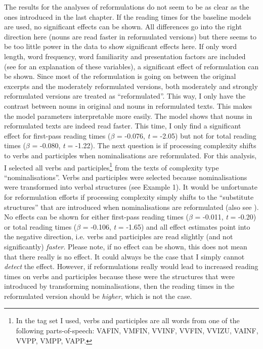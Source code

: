 \documentclass[output=paper]{langsci/langscibook}
\begin{document}
The results for the analyses of reformulations do not seem to be as clear as the ones introduced in the last chapter. If the reading times for the baseline models are used, no significant effects can be shown. All differences go into the right direction here (nouns are read faster in reformulated versions) but there seems to be too little power in the data to show significant effects here. If only word length, word frequency, word familiarity and presentation factors are included (see  for an explanation of these variables), a significant effect of reformulation can be shown. Since most of the reformulation is going on between the original excerpts and the moderately reformulated versions, both moderately and strongly reformulated versions are treated as ``reformulated''. This way, I only have the contrast between nouns in original and nouns in reformulated texts. This makes the model parameters interpretable more easily. The model shows that nouns in reformulated texts are indeed read faster. This time, I only find a significant effect for first-pass reading times (\textit{$\beta $} = -0.076, \textit{t} = -2.05) but not for total reading times (\textit{$\beta $} = -0.080, \textit{t} = -1.22).
The next question is if processing complexity shifts to verbs and participles when nominalisations are reformulated. For this analysis, I selected all verbs and participles\footnote{In the tag set I used, verbs and participles are all words from one of the following parts-of-speech: VAFIN, VMFIN, VVINF, VVFIN, VVIZU, VAINF, VVPP, VMPP, VAPP.}{ }from the texts of complexity type ``nominalisations''. Verbs and participles were selected because nominalisations were transformed into verbal structures (see Example 1). It would be unfortunate for reformulation efforts if processing complexity simply shifts to the ``substitute structures'' that are introduced when nominalisations are reformulated (also see ). No effects can be shown for either first-pass reading times (\textit{$\beta $} = -0.011, \textit{t} = -0.20) or total reading times (\textit{$\beta $} = -0.106, \textit{t} = -1.65) and all effect estimates point into the negative direction, i.e. verbs and participles are read slightly (and not significantly) \textit{faster}. Please note, if no effect can be shown, this does not mean that there really is no effect. It could always be the case that I simply cannot \textit{detect} the effect. However, if reformulations really would lead to increased reading times on verbs and participles because these were the structures that were introduced by transforming nominalisations, then the reading times in the reformulated version should be \textit{higher}, which is not the case. 
\end{document}
